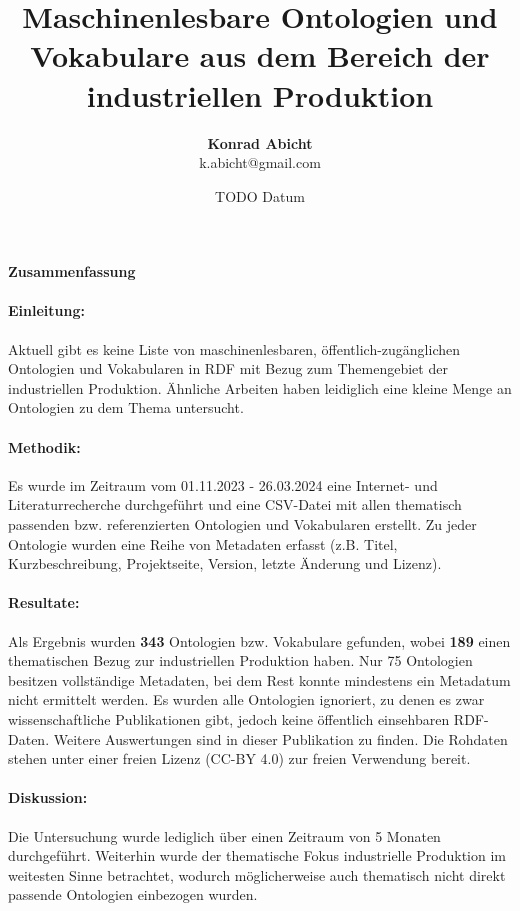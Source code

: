 \documentclass{article}
\title{Maschinenlesbare Ontologien und Vokabulare aus dem Bereich der industriellen Produktion}
\author{\textbf{Konrad Abicht} \\ k.abicht@gmail.com}
\date{TODO Datum}
\begin{document}
\maketitle

\paragraph{{\large Zusammenfassung}}

\paragraph{Einleitung:} Aktuell gibt es keine Liste von maschinenlesbaren, öffentlich-zugänglichen Ontologien und Vokabularen in RDF mit Bezug zum Themengebiet der industriellen Produktion. Ähnliche Arbeiten haben leidiglich eine kleine Menge an Ontologien zu dem Thema untersucht.

\paragraph{Methodik:} Es wurde im Zeitraum vom 01.11.2023 - 26.03.2024 eine Internet- und Literaturrecherche durchgeführt und eine CSV-Datei mit allen thematisch passenden bzw. referenzierten Ontologien und Vokabularen erstellt. Zu jeder Ontologie wurden eine Reihe von Metadaten erfasst (z.B. Titel, Kurzbeschreibung, Projektseite, Version, letzte Änderung und Lizenz).

\paragraph{Resultate:} Als Ergebnis wurden \textbf{343} Ontologien bzw. Vokabulare gefunden, wobei \textbf{189} einen thematischen Bezug zur industriellen Produktion haben. Nur 75 Ontologien besitzen vollständige Metadaten, bei dem Rest konnte mindestens ein Metadatum nicht ermittelt werden. Es wurden alle Ontologien ignoriert, zu denen es zwar wissenschaftliche Publikationen gibt, jedoch keine öffentlich einsehbaren RDF-Daten. Weitere Auswertungen sind in dieser Publikation zu finden. Die Rohdaten stehen unter einer freien Lizenz (CC-BY 4.0) zur freien Verwendung bereit.

\paragraph{Diskussion:} Die Untersuchung wurde lediglich über einen Zeitraum von 5 Monaten durchgeführt. Weiterhin wurde der thematische Fokus industrielle Produktion im weitesten Sinne betrachtet, wodurch möglicherweise auch thematisch nicht direkt passende Ontologien einbezogen wurden.
\end{document}
